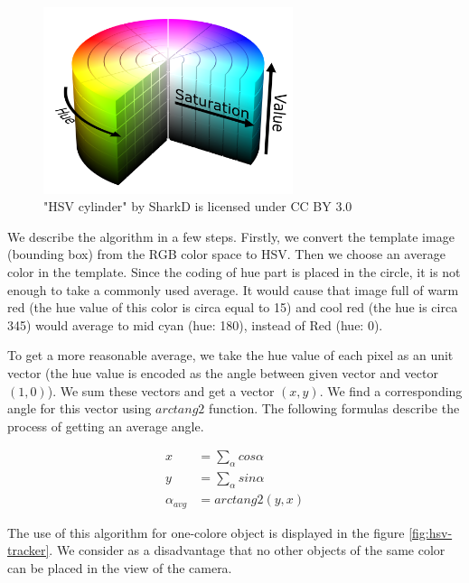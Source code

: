 \begin{figure}[h!]\centering
\includegraphics[width=0.65\textwidth]{img/hsv-cylinder.png}
\caption{"HSV cylinder" by SharkD is licensed under CC BY 3.0}
\end{figure}

We describe the algorithm in a few steps. Firstly, we convert the template
image (bounding box) from the RGB color space to HSV. Then we choose an average
color in the template. Since the coding of hue part is placed in the circle, it
is not enough to take a commonly used average. It would cause that image full
of warm red (the hue value of this color is circa equal to 15) and cool red
(the hue is circa 345) would average to mid cyan (hue: 180), instead of Red
(hue: 0).

To get a more reasonable average, we take the hue value of each pixel as an
unit vector (the hue value is encoded as the angle between given vector
and vector $(1, 0)$). We sum these vectors and get a vector $(x, y)$. We find a
corresponding angle for this vector using $arctang2$ function. The following
formulas describe the process of getting an average angle.


$$
\begin{aligned}
x &= \sum_\alpha cos \alpha \\
y &= \sum_\alpha sin \alpha \\
\alpha_{avg} &= arctang2(y, x)
\end{aligned}
$$

The use of this algorithm for one-colore object is displayed in the figure
\ref{fig:hsv-tracker}. We consider as a disadvantage that no other objects of
the same color can be placed in the view of the camera.

